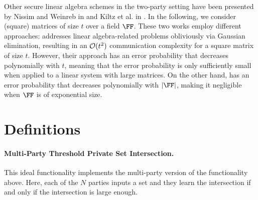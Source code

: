 Other secure linear algebra schemes in the two-party setting have been presented by Nissim and Weinreb in \cite{TCC:NisWei06} and Kiltz et al. in \cite{TCC:KMWF07}. In the following, we consider (square) matrices of size $t$ over a field $\FF$. These two works employ different approaches: \cite{TCC:NisWei06} addresses linear algebra-related problems obliviously via Gaussian elimination, resulting in an $\mathcal{O}(t^2)$ communication complexity for a square matrix of size $t$. However, their approach has an error probability that decreases polynomially with $t$, meaning that the error probability is only sufficiently small when applied to a linear system with large matrices. On the other hand, \cite{TCC:KMWF07} has an error probability that decreases polynomially with $|\FF|$, making it negligible when $\FF$ is of exponential size.\footnotemark



\section{Definitions}

\paragraph{Multi-Party Threshold  Private Set Intersection.} This ideal functionality implements the multi-party version of the functionality above. Here, each of the $N$ parties inputs a set and they learn the intersection if and only if the intersection is large enough.



